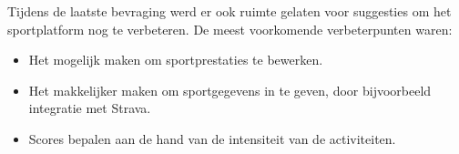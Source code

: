 Tijdens de laatste bevraging werd er ook ruimte gelaten voor suggesties om het sportplatform nog te verbeteren. De meest voorkomende verbeterpunten waren:

\begin{itemize}
  \item Het mogelijk maken om sportprestaties te bewerken.
  \item Het makkelijker maken om sportgegevens in te geven, door bijvoorbeeld integratie met Strava.
  \item Scores bepalen aan de hand van de intensiteit van de activiteiten.
\end{itemize}